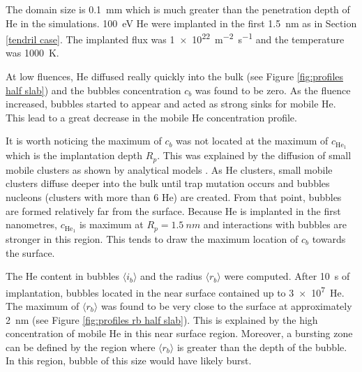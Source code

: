 The domain size is \SI{0.1}{mm} which is much greater than the penetration depth of He in the simulations.
\SI{100}{eV} He were implanted in the first \SI{1.5}{nm} as in Section \ref{tendril case}.
The implanted flux was \SI{1e22}{m^{-2} s^{-1}} and the temperature was \SI{1000}{K}.

At low fluences, He diffused really quickly into the bulk (see Figure \ref{fig:profiles half slab}) and the bubbles concentration $c_b$ was found to be zero.
As the fluence increased, bubbles started to appear and acted as strong sinks for mobile He.
This lead to a great decrease in the mobile He concentration profile.

It is worth noticing the maximum of $c_b$ was not located at the maximum of $c_{\mathrm{He}_1}$ which is the implantation depth $R_p$.
This was explained by the diffusion of small mobile clusters as shown by analytical models .
As He clusters, small mobile clusters diffuse deeper into the bulk until \gls{trap mutation} occurs and bubbles nucleons (clusters with more than 6 He) are created.
From that point, bubbles are formed relatively far from the surface.
Because He is implanted in the first nanometres, $c_{\mathrm{He}_1}$ is maximum at $R_p = \SI{1.5}{nm}$ and interactions with bubbles are stronger in this region.
This tends to draw the maximum location of $c_b$ towards the surface.

The He content in bubbles $\langle i_b \rangle$ and the radius $\langle r_b \rangle$ were computed.
After \SI{10}{s} of implantation, bubbles located in the near surface contained up to \SI{3e7}{He}.
The maximum of $\langle r_b \rangle$ was found to be very close to the surface at approximately \SI{2}{nm} (see Figure \ref{fig:profiles rb half slab}).
This is explained by the high concentration of mobile He in this near surface region.
Moreover, a bursting zone can be defined by the region where $\langle r_b \rangle$ is greater than the depth of the bubble.
In this region, bubble of this size would have likely burst.

